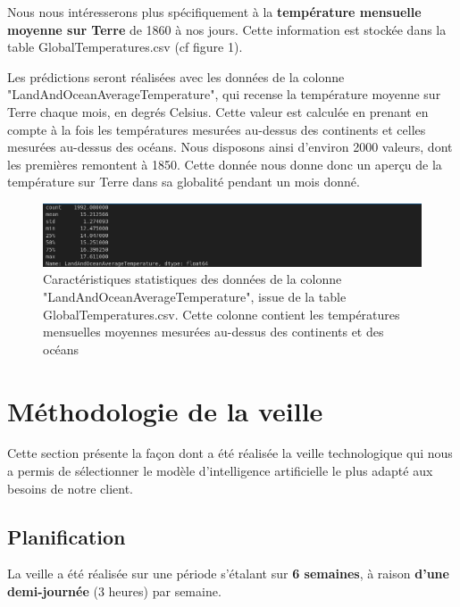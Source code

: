\documentclass[french]{article}
\begin{document}
    Nous nous intéresserons  plus spécifiquement à la \textbf{température mensuelle moyenne sur Terre} de 1860 à nos jours. Cette information est stockée dans la table GlobalTemperatures.csv (cf figure 1).
    


    Les prédictions seront réalisées avec les données de la colonne "LandAndOceanAverageTemperature", qui recense la température moyenne sur Terre chaque mois, en degrés Celsius. Cette valeur est calculée en prenant en compte à la fois les températures mesurées au-dessus des continents et celles mesurées au-dessus des océans. Nous disposons ainsi d'environ 2000 valeurs, dont les premières remontent à 1850. Cette donnée nous donne donc un aperçu de la température sur Terre dans sa globalité pendant un mois donné.
    \begin{figure}[h!]
        \includegraphics[width=12cm]{dataset}
        \centering
        \caption{Caractéristiques statistiques des données de la colonne "LandAndOceanAverageTemperature", issue de la table GlobalTemperatures.csv. Cette colonne contient les températures mensuelles moyennes mesurées au-dessus des continents et des océans}
        \centering
    \end{figure}

    \section{Méthodologie de la veille}
    Cette section présente la façon dont a été réalisée la veille technologique qui nous a permis de sélectionner le modèle d'intelligence artificielle le plus adapté aux besoins de notre client.

    \subsection{Planification}

    La veille a été réalisée sur une période s'étalant sur \textbf{6 semaines}, à raison \textbf{d'une demi-journée} (3 heures) par semaine.
\end{document}

